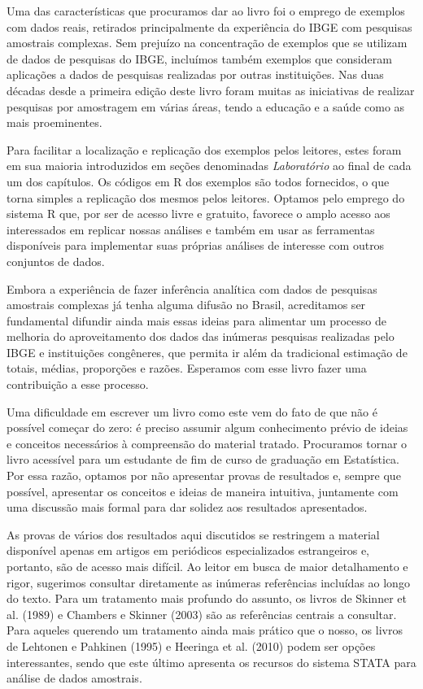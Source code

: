 \documentclass[
  12pt,
  brazilian,
]{book}
\theoremstyle{definition}
\theoremstyle{definition}
\theoremstyle{definition}
\theoremstyle{definition}
\theoremstyle{remark}
\begin{document}
Uma das características que procuramos dar ao livro foi o emprego de exemplos com dados reais, retirados principalmente da experiência do IBGE com pesquisas amostrais complexas. Sem prejuízo na concentração de exemplos que se utilizam de dados de pesquisas do IBGE, incluímos também exemplos que consideram aplicações a dados de pesquisas realizadas por outras instituições. Nas duas décadas desde a primeira edição deste livro foram muitas as iniciativas de realizar pesquisas por amostragem em várias áreas, tendo a educação e a saúde como as mais proeminentes.

Para facilitar a localização e replicação dos exemplos pelos leitores, estes foram em sua maioria introduzidos em seções denominadas \emph{Laboratório} ao final de cada um dos capítulos. Os códigos em R dos exemplos são todos fornecidos, o que torna simples a replicação dos mesmos pelos leitores. Optamos pelo emprego do sistema R que, por ser de acesso livre e gratuito, favorece o amplo acesso aos interessados em replicar nossas análises e também em usar as ferramentas disponíveis para implementar suas próprias análises de interesse com outros conjuntos de dados.

Embora a experiência de fazer inferência analítica com dados de pesquisas amostrais complexas já tenha alguma difusão no Brasil, acreditamos ser fundamental difundir ainda mais essas ideias para alimentar um processo de melhoria do aproveitamento dos dados das inúmeras pesquisas realizadas pelo IBGE e instituições congêneres, que permita ir além da tradicional estimação de totais, médias, proporções e razões. Esperamos com esse livro fazer uma contribuição a esse processo.

Uma dificuldade em escrever um livro como este vem do fato de que não é possível começar do zero: é preciso assumir algum conhecimento prévio de ideias e conceitos necessários à compreensão do material tratado. Procuramos tornar o livro acessível para um estudante de fim de curso de graduação em Estatística. Por essa razão, optamos por não apresentar provas de resultados e, sempre que possível, apresentar os conceitos e ideias de maneira intuitiva, juntamente com uma discussão mais formal para dar solidez aos resultados apresentados.

As provas de vários dos resultados aqui discutidos se restringem a material disponível apenas em artigos em periódicos especializados estrangeiros e, portanto, são de acesso mais difícil. Ao leitor em busca de maior detalhamento e rigor, sugerimos consultar diretamente as inúmeras referências incluídas ao longo do texto. Para um tratamento mais profundo do assunto, os livros de Skinner et al. (1989) e Chambers e Skinner (2003) são as referências centrais a consultar. Para aqueles querendo um tratamento ainda mais prático que o nosso, os livros de Lehtonen e Pahkinen (1995) e Heeringa et al. (2010) podem ser opções interessantes, sendo que este último apresenta os recursos do sistema STATA para análise de dados amostrais.
\end{document}
